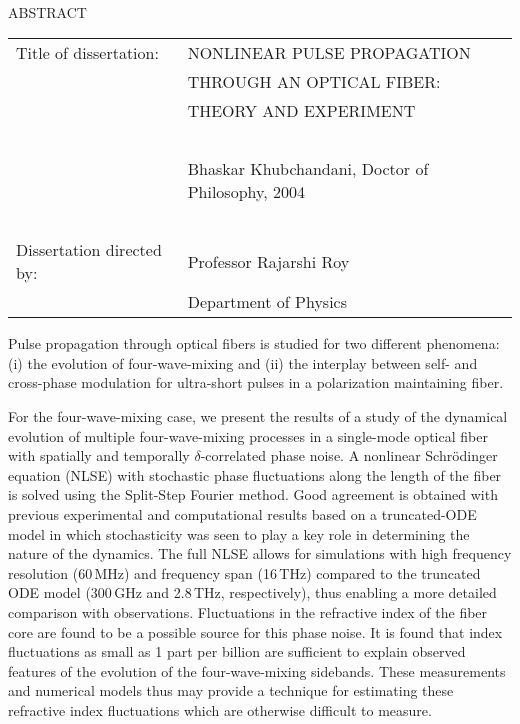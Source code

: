 
\hbox{\ }

\renewcommand{\baselinestretch}{1}
\small \normalsize

\begin{center}
\large{{ABSTRACT}} 

\vspace{3em} 

\end{center}
\hspace{-.15in}
\begin{tabular}{ll}
Title of dissertation:    & {\large  NONLINEAR PULSE PROPAGATION }\\
&				      {\large  THROUGH AN OPTICAL FIBER:} \\
&				      {\large  THEORY AND EXPERIMENT} \\
\ \\
&                          {\large  Bhaskar Khubchandani, Doctor of Philosophy, 2004} \\
\ \\
Dissertation directed by: & {\large  Professor Rajarshi Roy} \\
&  				{\large	 Department of Physics } \\
\end{tabular}

\vspace{3em}

\renewcommand{\baselinestretch}{2}
\large \normalsize

Pulse propagation through optical fibers is studied for two different phenomena: (i) the evolution of four-wave-mixing and (ii) the interplay between self- and cross-phase modulation for ultra-short pulses in a polarization maintaining fiber.

For the four-wave-mixing case, we present the results of a study of the dynamical evolution of multiple four-wave-mixing processes in a single-mode optical fiber with spatially and temporally $\delta$-correlated phase noise. A nonlinear Schr\"odinger equation (NLSE) with stochastic phase fluctuations along the length of the fiber is solved using the Split-Step Fourier method. Good agreement is obtained with previous experimental and computational results based on a truncated-ODE model in which stochasticity was seen to play a key role in determining the nature of the dynamics. The full NLSE allows for simulations with high frequency resolution (60\,MHz) and frequency span (16\,THz) compared to the truncated ODE model (300\,GHz and 2.8\,THz, respectively), thus enabling a more detailed comparison with observations. Fluctuations in the refractive index of the fiber core are found to be a possible source for this phase noise. It is found that index fluctuations as small as 1 part per billion are sufficient to explain observed features of the evolution of the four-wave-mixing sidebands. These measurements and numerical models thus may provide a technique for estimating these refractive index fluctuations which are otherwise difficult to measure.

